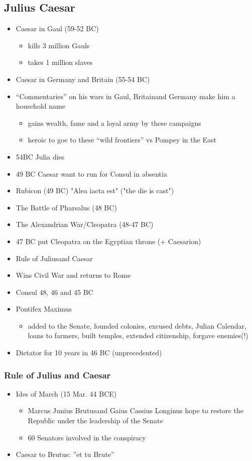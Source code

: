 \documentclass[12pt, twoside]{article}
\begin{document}
\subsection{Julius Caesar}
\begin{itemize}
\item Caesar in Gaul (59-52 BC)
	\begin{itemize}
	\item kills 3 million Gauls
	\item takes 1 million slaves
	\end{itemize}
\item Caesar in Germany and Britain (55-54 BC) 
\item “Commentaries” on his wars in Gaul, Britainand Germany make him a household name
	\begin{itemize}
	\item gains wealth, fame and a loyal army by these campaigns
	\item heroic to goe to these “wild frontiers” vs Pompey in the East
	\end{itemize}
\item 54BC Julia dies
\item 49 BC Caesar want to run for Consul in absentia
\item Rubicon (49 BC) "Alea iacta est" ("the die is cast")
\item The Battle of Pharsalus (48 BC)
\item The Alexandrian War/Cleopatra (48-47 BC)
\item 47 BC put Cleopatra on the Egyptian throne (+ Caesarion)
\item Rule of Juliusand Caesar
\item Wins Civil War and returns to Rome
\item Consul 48, 46 and 45 BC
\item Pontifex Maximus
	\begin{itemize}
	\item added to the Senate, founded colonies, excused debts, Julian Calendar, loans to farmers, built temples, extended citizenship, forgave enemies(!)
	\end{itemize}
\item Dictator for 10 years in 46 BC (unprecedented)
\end{itemize}
		
\subsubsection{Rule of Julius and Caesar}
\begin{itemize}
\item Ides of March (15 Mar. 44 BCE)
	\begin{itemize}
	\item Marcus Junius Brutusand Gaius Cassius Longinus hope to restore the Republic under the leadership of the Senate
	\item 60 Senators involved in the conspiracy
	\end{itemize}
\item Caesar to Brutus: ”et tu Brute”
\end{itemize}
\end{document}
